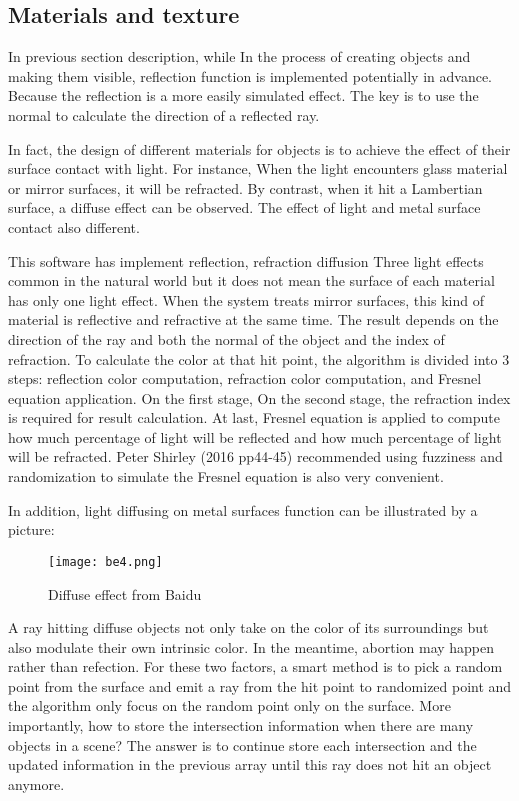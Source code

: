 \documentclass[11pt]{article}
\begin{document}
\subsection{Materials and texture}
In previous section description, while In the process of creating objects and making them visible, reflection function is implemented potentially in advance. Because the reflection is a more easily simulated effect. The key is to use the normal to calculate the direction of a reflected ray.

In fact, the design of different materials for objects is to achieve the effect of their surface contact with light. For instance, When the light encounters glass material or mirror surfaces, it will be refracted. By contrast, when it hit a Lambertian surface, a diffuse effect can be observed. The effect of light and metal surface contact also different.

This software has implement reflection, refraction diffusion Three light effects common in the natural world but it does not mean the surface of each material has only one light effect. When the system treats mirror surfaces, this kind of material is reflective and refractive at the same time. The result depends on the direction of the ray and both the normal of the object and the index of refraction. To calculate the color at that hit point, the algorithm is divided into 3 steps: reflection color computation, refraction color computation, and Fresnel equation application. On the first stage, On the second stage, the refraction index is required for result calculation. At last, Fresnel equation is applied to compute how much percentage of light will be reflected and how much percentage of light will be refracted. Peter Shirley (2016 pp44-45) recommended using fuzziness and randomization to simulate the Fresnel equation is also very convenient.

In addition, light diffusing on metal surfaces function can be illustrated by a picture:

\begin{figure}[H]

\centering
\texttt{[image: be4.png]}
\caption{Diffuse effect from Baidu}
\label{fig:label}
\end{figure}

A ray hitting diffuse objects not only take on the color of its surroundings but also modulate their own intrinsic color. In the meantime, abortion may happen rather than refection. For these two factors, a smart method is to pick a random point from the surface and emit a ray from the hit point to randomized point and the algorithm only focus on the random point only on the surface.
More importantly, how to store the intersection information when there are many objects in a scene? The answer is to continue store each intersection and the updated information in the previous array until this ray does not hit an object anymore.
\end{document}
